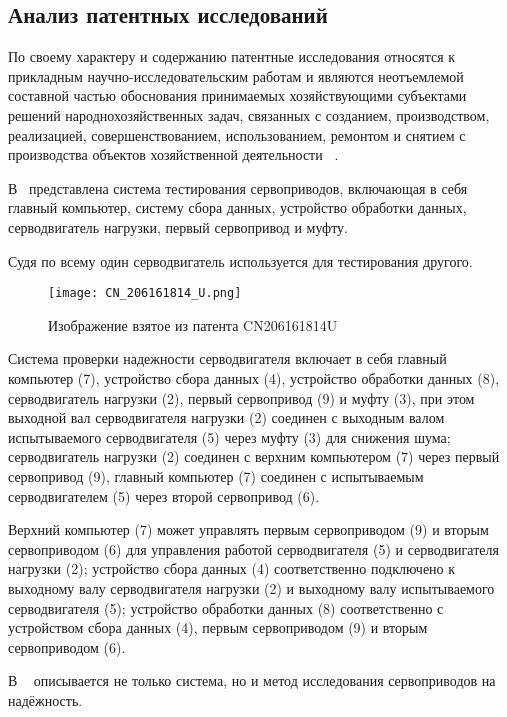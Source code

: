\subsection{Анализ патентных исследований}

По своему характеру и содержанию патентные исследования относятся к
прикладным научно-исследовательским работам и являются неотъемлемой
составной частью обоснования принимаемых хозяйствующими субъектами
решений народнохозяйственных задач, связанных с созданием,
производством, реализацией, совершенствованием, использованием,
ремонтом и снятием с производства
объектов хозяйственной деятельности ~\cite{GOST-R-15.011-96}.

В~\cite{CN206161814U} представлена система тестирования сервоприводов,
включающая в себя главный компьютер, систему сбора данных, устройство
обработки данных, серводвигатель нагрузки, первый сервопривод и муфту.

Судя по всему один серводвигатель используется для тестирования
другого.

\begin{figure}[H]
  \centering
  \texttt{[image: CN\_206161814\_U.png]}
  \caption{Изображение взятое из патента CN206161814U}
\end{figure}

Система проверки надежности серводвигателя включает в себя главный
компьютер (7), устройство сбора данных (4), устройство обработки
данных (8), серводвигатель нагрузки (2), первый сервопривод (9) и
муфту (3), при этом выходной вал серводвигателя нагрузки (2) соединен
с выходным валом испытываемого серводвигателя (5) через муфту (3) для
снижения шума; серводвигатель нагрузки (2) соединен с верхним
компьютером (7) через первый сервопривод (9), главный компьютер (7)
соединен с испытываемым серводвигателем (5) через второй сервопривод
(6).

Верхний компьютер (7) может управлять первым сервоприводом (9) и
вторым сервоприводом (6) для управления работой серводвигателя (5) и
серводвигателя нагрузки (2); устройство сбора данных (4)
соответственно подключено к выходному валу серводвигателя нагрузки (2)
и выходному валу испытываемого серводвигателя (5); устройство
обработки данных (8) соответственно с устройством сбора данных (4),
первым сервоприводом (9) и вторым сервоприводом (6).

В  ~\cite{CN108106873B} описывается не только система, но и метод исследования
сервоприводов на надёжность.

